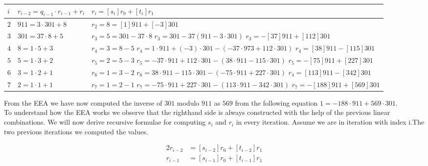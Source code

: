 \begin{center}
\begin{tabular}{|l|l|p{5cm}| } 
\hline
$i$ & $r_{i-2} = q_{i-1} \cdot r_{i-1}+r_i$ & $r_i = [s_i]r_0 +[t_i]r_1$ \\ 
\hline
$2$ & $911 = 3 \cdot 301 +8$& $r_2=8= [1] 911 + [-3]301$ \\ 
\hline
$3$ & $301 = 37 \cdot 8+5$ & $r_3= 5= 301-37 \cdot 8$ \newline $ r_3 = 301 -37(911-3 \cdot 301)$ \newline $r_3 = -[37]911 + [112]301$\\
\hline
$4$ & $8 = 1 \cdot 5+3$ & $r_4= 3 = 8-5$ \newline $r_4 = 1 \cdot 911 + (-3) \cdot 301 - (-37 \cdot 973 + 112 \cdot 301)$ \newline $r_4 = [38]911 - [115]301$  \\
\hline
$5$ & $5 = 1 \cdot 3+2$ & $r_5= 2= 5-3$ \newline $r_5=-37 \cdot 911 + 112 \cdot 301 - (38 \cdot 911 - 115 \cdot 301)$  \newline  $r_5 = -[75]911 + [227]301$ \\
\hline
$6$ & $3 = 1 \cdot 2+1$ & $r_6= 1 = 3-2$ \newline $r_6=38 \cdot 911 - 115 \cdot 301 -(-75 \cdot 911 +  227 \cdot 301)$ \newline $r_4=[113]911-[342] 301$  \\ 
\hline
$7$ & $2 = 1 \cdot 1+1$ & $r_7= 1 = 2-1$ \newline $r_7=-75 \cdot 911 + 227 \cdot 301 -(113 \cdot 911- 342 \cdot 301)$ \newline $r_7=-[188]911+[569] 301$  \\ 
\hline
\end{tabular}
\end{center}

\noindent
From the EEA we have now computed the inverse of $301$ modulo $911$ as $569$  from the following equation  $1 = -188 \cdot 911 + 569 \cdot 301$.\\

\noindent
To understand how the EEA works we observe that the righthand side is always constructed with the help of the previous linear combinations. We will now derive recursive formulae for computing $s_i$ and $r_i$ in every iteration. Assume we are in iteration with index i.The two previous iterations we computed the values.

\noindent
\begin{alignat*}{2}
r_{i - 2} &= [s_{i-2}]r_0 +[t_{i-2}]r_1\\
r_{i-1} &= [s_{i-1}]r_0 +[t_{i-1}]r_1   
\end{alignat*}



